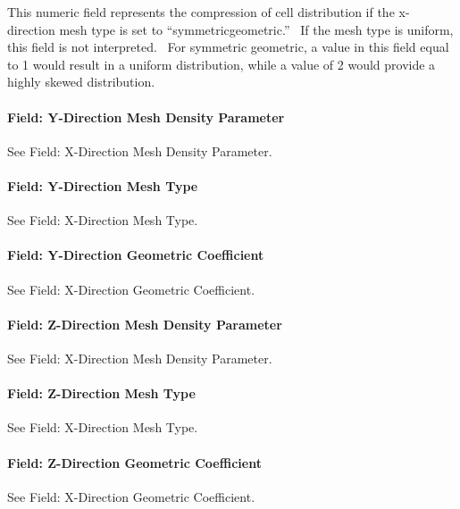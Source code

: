 This numeric field represents the compression of cell distribution if the x-direction mesh type is set to ``symmetricgeometric.''~ If the mesh type is uniform, this field is not interpreted.~ For symmetric geometric, a value in this field equal to 1 would result in a uniform distribution, while a value of 2 would provide a highly skewed distribution.

\paragraph{Field: Y-Direction Mesh Density Parameter}\label{field-y-direction-mesh-density-parameter}

See Field: X-Direction Mesh Density Parameter.

\paragraph{Field: Y-Direction Mesh Type}\label{field-y-direction-mesh-type}

See Field: X-Direction Mesh Type.

\paragraph{Field: Y-Direction Geometric Coefficient}\label{field-y-direction-geometric-coefficient}

See Field: X-Direction Geometric Coefficient.

\paragraph{Field: Z-Direction Mesh Density Parameter}\label{field-z-direction-mesh-density-parameter}

See Field: X-Direction Mesh Density Parameter.

\paragraph{Field: Z-Direction Mesh Type}\label{field-z-direction-mesh-type}

See Field: X-Direction Mesh Type.

\paragraph{Field: Z-Direction Geometric Coefficient}\label{field-z-direction-geometric-coefficient}

See Field: X-Direction Geometric Coefficient.

